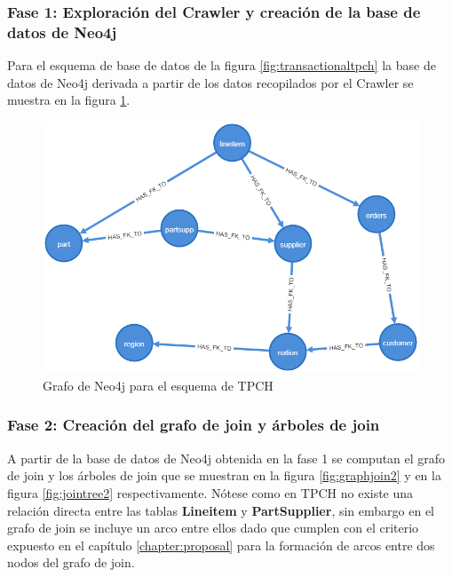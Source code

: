 \subsubsection{Fase 1: Exploraci\'on del Crawler y creaci\'on de la base de datos de Neo4j}

Para el esquema de base de datos de la figura \ref{fig:transactionaltpch} la base de datos de Neo4j derivada a 
partir de los datos recopilados por el Crawler se muestra en la figura \ref{fig:catalogexp2}.

\begin{figure}
  \centering
  \includegraphics[scale=0.4]{Graphics/graph (2).png}
  \caption{Grafo de Neo4j para el esquema de TPCH}
  \label{fig:catalogexp2}
\end{figure}

\subsubsection{Fase 2: Creaci\'on del grafo de join y \'arboles de join}

A partir de la base de datos de Neo4j obtenida en la fase 1 se computan el grafo de join y los \'arboles de 
join que se muestran en la figura \ref{fig:graphjoin2} y en la figura \ref{fig:jointree2} respectivamente. 
N\'otese como en TPCH no existe una relaci\'on directa entre las tablas \textbf{Lineitem} y \textbf{PartSupplier}, 
sin embargo en el grafo de join se incluye un arco entre ellos dado que cumplen con el criterio expuesto 
en el cap\'itulo \ref{chapter:proposal} para la formaci\'on de arcos entre dos nodos del grafo de join.

